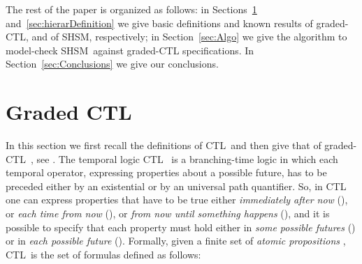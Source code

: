 \documentclass[letterpaper,twocolumn,10pt]{article}
\def    \ctl        {\mbox{\textsc{CTL }\xspace}}
\def    \CTL        {\mbox{\textsc{CTL }\xspace}}
\newcommand{\VHSM}{SHSM}
\begin{document}
The rest of the paper is organized as follows:
in Sections~\ref{sec:gradedDefinition}
and~\ref{sec:hierarDefinition}
we give basic definitions and known results
of graded-CTL, and of SHSM, respectively;
in Section~\ref{sec:Algo} we give the algorithm to model-check \VHSM\
against graded-CTL  specifications.
In Section~\ref{sec:Conclusions} we give our conclusions.

\section{Graded \CTL}\label{sec:gradedDefinition}
In this section we first recall the definitions of \ctl and then give that of
graded-\ctl,
see \cite{FNP08}.
The temporal logic \ctl \cite{CE82} is a branching-time logic in
which each temporal operator, expressing properties about a
possible future, has to be preceded either by an  existential or
by an universal path quantifier. So, in \ctl
one can express properties that have to be true either
\emph{immediately after now} (), or \emph{each time from now}
(), or \emph{from now until something happens} (), and it
is possible to specify that each property must hold either in
\emph{some possible futures} () or in \emph{each possible
future} (). Formally, given a finite set of \emph{atomic
propositions} , \ctl is the set of formulas
 defined as follows:
    
\end{document}
